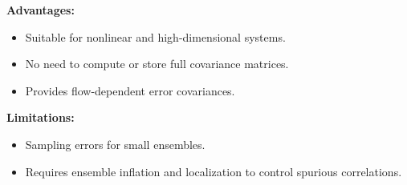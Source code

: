 \documentclass[a4paper]{article}
\begin{document}
\textbf{Advantages:}\\

\begin{itemize}
  \item Suitable for nonlinear and high-dimensional systems.
  \item No need to compute or store full covariance matrices.
  \item Provides flow-dependent error covariances.
\end{itemize}

\textbf{Limitations:}\\

\begin{itemize}
  \item Sampling errors for small ensembles.
  \item Requires ensemble inflation and localization to control spurious correlations.
\end{itemize}
\end{document}
